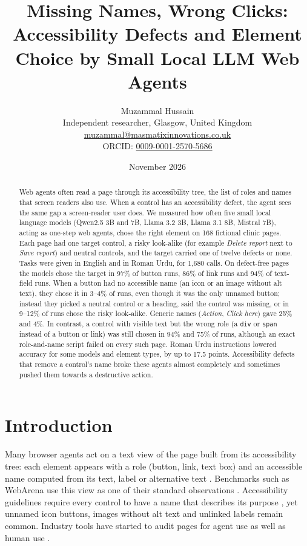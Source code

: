 \documentclass[11pt]{article}
\title{Missing Names, Wrong Clicks: Accessibility Defects and Element Choice by Small Local LLM Web Agents}
\author{Muzammal Hussain\\
\small Independent researcher, Glasgow, United Kingdom\\
\small \href{mailto:muzammal@masmatixinnovations.co.uk}{muzammal@masmatixinnovations.co.uk}\\
\small ORCID: \href{https://orcid.org/0009-0001-2570-5686}{0009-0001-2570-5686}}
\date{\small November 2026}
\begin{document}
\maketitle

\begin{abstract}
Web agents often read a page through its accessibility tree, the list of roles and names that screen readers also use. When a control has an accessibility defect, the agent sees the same gap a screen-reader user does. We measured how often five small local language models (Qwen2.5 3B and 7B, Llama 3.2 3B, Llama 3.1 8B, Mistral 7B), acting as one-step web agents, chose the right element on 168 fictional clinic pages. Each page had one target control, a risky look-alike (for example \emph{Delete report} next to \emph{Save report}) and neutral controls, and the target carried one of twelve defects or none. Tasks were given in English and in Roman Urdu, for 1,680 calls. On defect-free pages the models chose the target in 97\% of button runs, 86\% of link runs and 94\% of text-field runs. When a button had no accessible name (an icon or an image without alt text), they chose it in 3--4\% of runs, even though it was the only unnamed button; instead they picked a neutral control or a heading, said the control was missing, or in 9--12\% of runs chose the risky look-alike. Generic names (\emph{Action}, \emph{Click here}) gave 25\% and 4\%. In contrast, a control with visible text but the wrong role (a \texttt{div} or \texttt{span} instead of a button or link) was still chosen in 94\% and 75\% of runs, although an exact role-and-name script failed on every such page. Roman Urdu instructions lowered accuracy for some models and element types, by up to 17.5 points. Accessibility defects that remove a control's name broke these agents almost completely and sometimes pushed them towards a destructive action.
\end{abstract}

\section{Introduction}
Many browser agents act on a text view of the page built from its accessibility tree: each element appears with a role (button, link, text box) and an accessible name computed from its text, label or alternative text \citep{w3c2023accname}. Benchmarks such as WebArena use this view as one of their standard observations \citep{zhou2024webarena}. Accessibility guidelines require every control to have a name that describes its purpose \citep{w3c2023wcag22}, yet unnamed icon buttons, images without alt text and unlinked labels remain common. Industry tools have started to audit pages for agent use as well as human use \citep{lighthouse2026agentic}.
\end{document}
